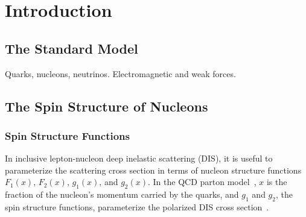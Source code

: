 \section{Introduction} \label{sec:intro}
\hspace{\parindent}

\subsection{The Standard Model}\label{sec:standardmodel}

Quarks, nucleons, neutrinos. Electromagnetic and weak forces.


\subsection{The Spin Structure of Nucleons} \label{sec:nuctheory}

  \subsubsection{Spin Structure Functions}
  In inclusive lepton-nucleon deep inelastic scattering (DIS), it is useful to
  parameterize the scattering cross section in terms of nucleon structure
  functions $F_1(x)$, $F_2(x)$, $g_1(x)$, and $g_2(x)$. In the QCD parton
  model~\cite{Feynman:1969wa}, $x$ is the fraction of the nucleon's momentum
  carried by the quarks, and $g_1$ and $g_2$, the spin structure functions,
  parameterize the polarized DIS cross section~\cite{Thomas:2001kw}.

